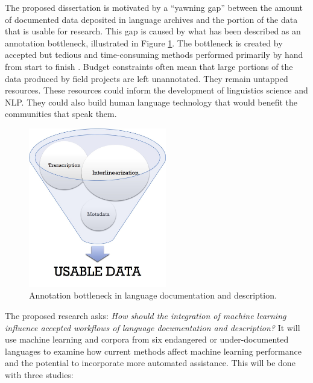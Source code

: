 The proposed dissertation is motivated by a “yawning gap” \citep{seifart_language_2018} between the amount of documented data deposited in language archives and the portion of the data that is usable for research. This gap is caused by what has been described as an annotation bottleneck, illustrated in Figure \ref{fig:bottleneck}. The bottleneck is created by accepted but tedious and time-consuming methods performed primarily by hand from start to finish \citep{simons_worlds_2013,holton_developing_2017}. 
Budget constraints often mean that large portions of the data produced by field projects are left unannotated. They remain untapped resources. These resources could inform the development of linguistics science and NLP. They could also build human language technology that would benefit the communities that speak them. 


\begin{figure}[hbt]
    \centering
    \includegraphics[width=6cm]{figs/AnnotationFunnel.jpg}
    \caption[Annotation Bottleneck]{Annotation bottleneck in language documentation and description.}
    \label{fig:bottleneck}
\end{figure}


The proposed research asks: \emph{How should the integration of machine learning  influence accepted workflows of language documentation and description?} It will use machine learning and corpora from six endangered or under-documented languages to  
examine how current methods affect machine learning performance and the potential to incorporate more automated assistance. This will be done with three studies:

